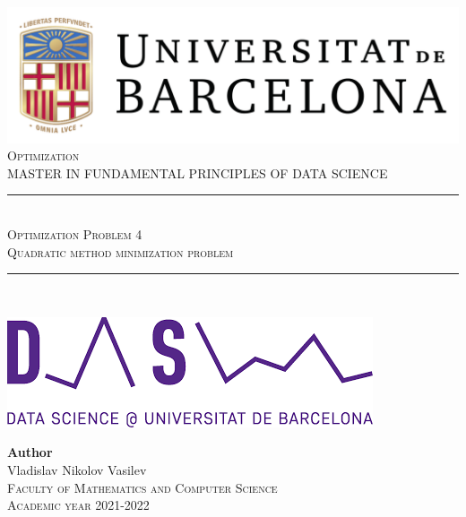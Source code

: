 \documentclass[11pt,a4paper]{article}
\newcommand{\subject}{Optimization}
\newcommand{\autor}{Vladislav Nikolov Vasilev}
\newcommand{\titulo}{Optimization Problem 4}
\newcommand{\subtitulo}{Quadratic method minimization problem}
\newcommand{\masters}{Master in Fundamental Principles of Data Science}
\begin{document}

\begin{titlepage}
  \begin{minipage}{\textwidth}
    \centering
    \includegraphics[scale=0.25]{img/ub-logo}\\[2cm]
    
    \textsc{\Large \subject\\[0.5cm]}
    \textsc{\uppercase\expandafter{\masters}}\\[1.5cm]
    
    \noindent\rule[-1ex]{\textwidth}{1pt}\\[1.5ex]
    \textsc{{\Huge \titulo\\[0.5ex]}}
    \textsc{{\Large \subtitulo\\}}
    \noindent\rule[-1ex]{\textwidth}{2pt}\\[3.5ex]
  \end{minipage}
  
  \vspace{2cm}
  
  \begin{minipage}{\textwidth}
    \centering
    
    \includegraphics[scale=0.4]{img/ub-ds-logo}
    \vspace{2cm}
    
    \textbf{Author}\\ {\autor{}}\\[2.5ex]
    \textsc{Faculty of Mathematics and Computer Science}\\
    \vspace{1em}
    \textsc{Academic year 2021-2022}
  \end{minipage}
\end{titlepage}
\end{document}
